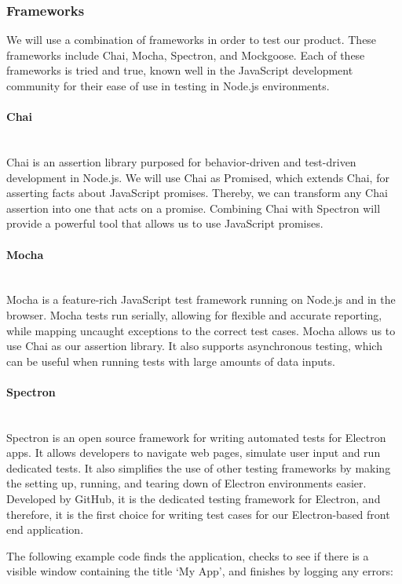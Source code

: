 \subsubsection{Frameworks}
We will use a combination of frameworks in order to test our product. These frameworks include Chai, Mocha, Spectron, and Mockgoose. Each of these frameworks is tried and true, known well in the JavaScript development community for their ease of use in testing in Node.js environments.

\paragraph{Chai} \mbox{}\\[\paragraphheaderspace]
Chai is an assertion library purposed for behavior-driven and test-driven development in Node.js. We will use Chai as Promised, which extends Chai, for asserting facts about JavaScript promises. Thereby, we can transform any Chai assertion into one that acts on a promise. Combining Chai with Spectron will provide a powerful tool that allows us to use JavaScript promises.

\paragraph{Mocha} \mbox{}\\[\paragraphheaderspace]
Mocha is a feature-rich JavaScript test framework running on Node.js and in the browser. Mocha tests run serially, allowing for flexible and accurate reporting, while mapping uncaught exceptions to the correct test cases. Mocha allows us to use Chai as our assertion library. It also supports asynchronous testing, which can be useful when running tests with large amounts of data inputs.

\paragraph{Spectron} \mbox{}\\[\paragraphheaderspace]
Spectron is an open source framework for writing automated tests for Electron apps. It allows developers to navigate web pages, simulate user input and run dedicated tests. It also simplifies the use of other testing frameworks by making the setting up, running, and tearing down of Electron environments easier. Developed by GitHub, it is the dedicated testing framework for Electron, and therefore, it is the first choice for writing test cases for our Electron-based front end application.\par
The following example code finds the application, checks to see if there is a visible window containing the title \lq My App\rq, and finishes by logging any errors:

